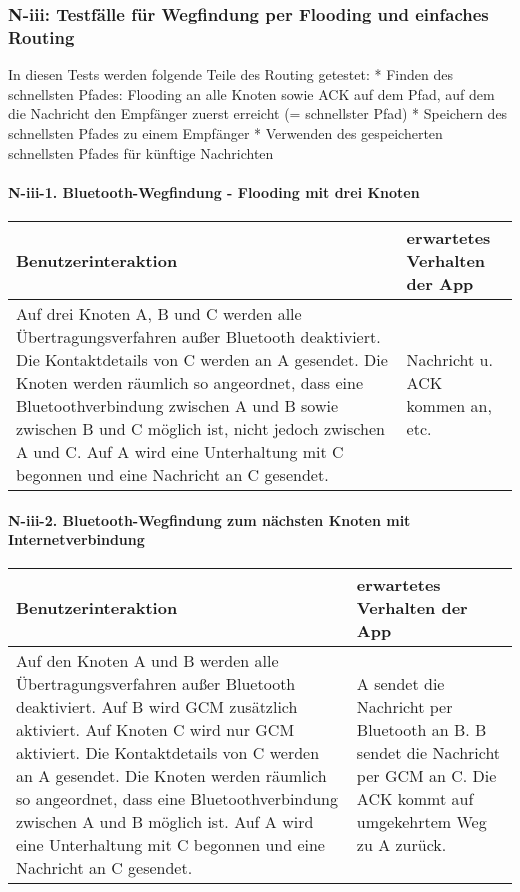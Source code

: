 

\subsubsection{N-iii: Testfälle für Wegfindung per Flooding und einfaches
Routing}\label{iii-testfuxe4lle-fuxfcr-wegfindung-per-flooding-und-einfaches-routing}

In diesen Tests werden folgende Teile des Routing getestet: * Finden des
schnellsten Pfades: Flooding an alle Knoten sowie ACK auf dem Pfad, auf
dem die Nachricht den Empfänger zuerst erreicht (= schnellster Pfad) *
Speichern des schnellsten Pfades zu einem Empfänger * Verwenden des
gespeicherten schnellsten Pfades für künftige Nachrichten

\paragraph{N-iii-1. Bluetooth-Wegfindung - Flooding mit drei
Knoten}\label{bluetooth-wegfindung---flooding-mit-drei-knoten}

\begin{longtable}{p{8cm}p{8.5cm}}
\toprule
Benutzerinteraktion & erwartetes Verhalten der App\tabularnewline
\midrule
\endhead
Auf drei Knoten A, B und C werden alle Übertragungsverfahren außer
Bluetooth deaktiviert. Die Kontaktdetails von C werden an A gesendet.
Die Knoten werden räumlich so angeordnet, dass eine Bluetoothverbindung
zwischen A und B sowie zwischen B und C möglich ist, nicht jedoch
zwischen A und C. Auf A wird eine Unterhaltung mit C begonnen und eine
Nachricht an C gesendet. & Nachricht u. ACK kommen an,
etc.\tabularnewline
\bottomrule
\end{longtable}

\paragraph{N-iii-2. Bluetooth-Wegfindung zum nächsten Knoten mit
Internetverbindung}\label{bluetooth-wegfindung-zum-nuxe4chsten-knoten-mit-internetverbindung}

\begin{longtable}{p{8cm}p{8.5cm}}
\toprule
Benutzerinteraktion & erwartetes Verhalten der App\tabularnewline
\midrule
\endhead
Auf den Knoten A und B werden alle Übertragungsverfahren außer Bluetooth deaktiviert. 
Auf B wird GCM zusätzlich aktiviert. Auf Knoten C wird nur GCM aktiviert. 
Die Kontaktdetails von C werden an A gesendet. 
Die Knoten werden räumlich so angeordnet, dass eine Bluetoothverbindung zwischen A und B möglich ist. 
Auf A wird eine Unterhaltung mit C begonnen und eine Nachricht an C gesendet.
& A sendet die Nachricht per Bluetooth an B.
B sendet die Nachricht per GCM an C. 
Die ACK kommt auf umgekehrtem Weg zu A zurück.\tabularnewline
\bottomrule
\end{longtable}

